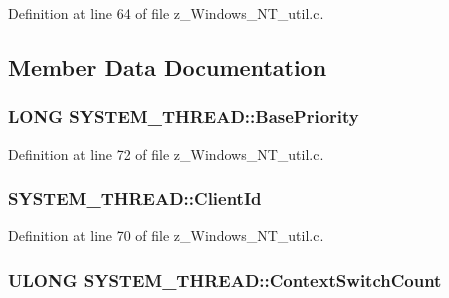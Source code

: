 Definition at line 64 of file z\-\_\-\-Windows\-\_\-\-N\-T\-\_\-util.\-c.



\subsection{Member Data Documentation}
\hypertarget{structSYSTEM__THREAD_ada7deae87a563f8523322c2f3751cd95}{
\subsubsection[{Base\-Priority}]{\setlength{\rightskip}{0pt plus 5cm}L\-O\-N\-G S\-Y\-S\-T\-E\-M\-\_\-\-T\-H\-R\-E\-A\-D\-::\-Base\-Priority}}\label{structSYSTEM__THREAD_ada7deae87a563f8523322c2f3751cd95}


Definition at line 72 of file z\-\_\-\-Windows\-\_\-\-N\-T\-\_\-util.\-c.

\hypertarget{structSYSTEM__THREAD_aa71e5a8c78ecfb8b9508ab715d723fda}{
\subsubsection[{Client\-Id}]{ S\-Y\-S\-T\-E\-M\-\_\-\-T\-H\-R\-E\-A\-D\-::\-Client\-Id}}\label{structSYSTEM__THREAD_aa71e5a8c78ecfb8b9508ab715d723fda}


Definition at line 70 of file z\-\_\-\-Windows\-\_\-\-N\-T\-\_\-util.\-c.

\hypertarget{structSYSTEM__THREAD_a7b6868bf760ee7bccf074b71537356c8}{
\subsubsection[{Context\-Switch\-Count}]{\setlength{\rightskip}{0pt plus 5cm}U\-L\-O\-N\-G S\-Y\-S\-T\-E\-M\-\_\-\-T\-H\-R\-E\-A\-D\-::\-Context\-Switch\-Count}}\label{structSYSTEM__THREAD_a7b6868bf760ee7bccf074b71537356c8}


